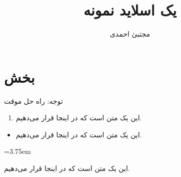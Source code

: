 \documentclass{beamer}
\title{یک اسلاید نمونه}
\author{مجتبیٰ احمدی}
\begin{document}
\section{بخش}
\begin{frame}
توجه: راه حل موقت
\begin{enumerate}\itemindent=1.75em
\item 
این یک متن است که در اینجا قرار می‌دهیم.
\end{enumerate}
\begin{itemize}\itemindent=1.75em
\item 
این یک متن است که در اینجا قرار می‌دهیم.
\end{itemize}
\begin{description}\itemindent=3.75em
\item[آزمایش]
این یک متن است که در اینجا قرار می‌دهیم.
\end{description}

\end{frame}
\end{document}
